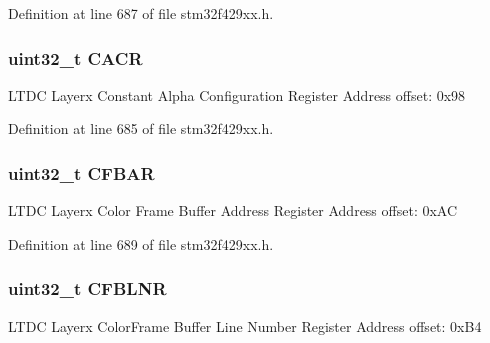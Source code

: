 Definition at line 687 of file stm32f429xx.\+h.

\subsubsection[{\texorpdfstring{C\+A\+CR}{CACR}}]{ uint32\+\_\+t C\+A\+CR}\hypertarget{struct_l_t_d_c___layer___type_def_a47be8b57cf19a433c0682d91a0524463}{}\label{struct_l_t_d_c___layer___type_def_a47be8b57cf19a433c0682d91a0524463}
L\+T\+DC Layerx Constant Alpha Configuration Register Address offset\+: 0x98 

Definition at line 685 of file stm32f429xx.\+h.

\subsubsection[{\texorpdfstring{C\+F\+B\+AR}{CFBAR}}]{ uint32\+\_\+t C\+F\+B\+AR}\hypertarget{struct_l_t_d_c___layer___type_def_a11b37b8303d2ddad1ee962c362cad796}{}\label{struct_l_t_d_c___layer___type_def_a11b37b8303d2ddad1ee962c362cad796}
L\+T\+DC Layerx Color Frame Buffer Address Register Address offset\+: 0x\+AC 

Definition at line 689 of file stm32f429xx.\+h.

\subsubsection[{\texorpdfstring{C\+F\+B\+L\+NR}{CFBLNR}}]{ uint32\+\_\+t C\+F\+B\+L\+NR}\hypertarget{struct_l_t_d_c___layer___type_def_ad94a5782e5cc67b071738f8096bb4855}{}\label{struct_l_t_d_c___layer___type_def_ad94a5782e5cc67b071738f8096bb4855}
L\+T\+DC Layerx Color\+Frame Buffer Line Number Register Address offset\+: 0x\+B4 

